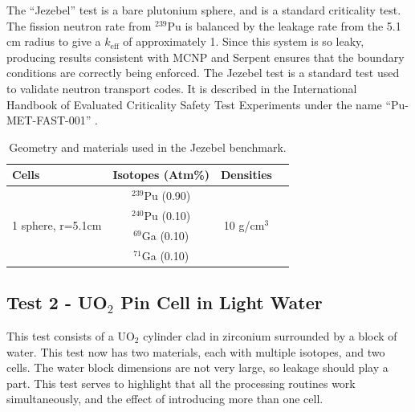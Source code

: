 \documentclass[preprint,12pt]{elsarticle}
\begin{document}
The ``Jezebel'' test is a bare plutonium sphere, and is a standard criticality test.   The fission neutron rate from $^{239}$Pu is balanced by the leakage rate from the 5.1 cm radius to give a $k_\mathrm{eff}$ of approximately 1.  Since this system is so leaky, producing results consistent with MCNP and Serpent ensures that the boundary conditions are correctly being enforced.  The Jezebel test is a standard test used to validate neutron transport codes.  It is described in the International Handbook of Evaluated Criticality Safety Test Experiments under the name ``Pu-MET-FAST-001'' \cite{bench_handbook}.  

\begin{table}[h]
\centering
\caption{Geometry and materials used in the Jezebel benchmark.}
\label{jezebel_geom}
\begin{tabular}{| l | c | c | c |}
\hline
Cells & Isotopes (Atm\%)& Densities \\
\hline
\multirow{4}{*}{1 sphere, r=5.1cm }  &   $^{239}$Pu   (0.90) &    \multirow{4}{*}{10 g/cm$^3$} \\
&  $^{240}$Pu (0.10)& \\
&  $^{69}$Ga  (0.10)& \\
&  $^{71}$Ga (0.10) & \\ 
\hline
\end{tabular}
\end{table}


\subsection{Test 2 - UO$_2$ Pin Cell in Light Water}

This test consists of a UO$_2$ cylinder clad in zirconium surrounded by a block of water.  This test now has two materials, each with multiple isotopes, and two cells.  The water block dimensions are not very large, so leakage should play a part.  This test serves to highlight that all the processing routines work simultaneously, and the effect of introducing more than one cell.
\end{document}
